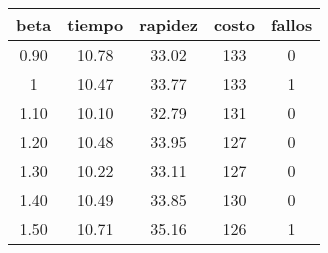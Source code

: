 \begin{table}[h!]
\centering
\begin{tabular}{ccccc}
beta & tiempo & rapidez & costo & fallos \\ 
\hline 
0.90 & 10.78 & 33.02 & 133 & 0 \\ 
1 & 10.47 & 33.77 & 133 & 1 \\ 
1.10 & 10.10 & 32.79 & 131 & 0 \\ 
1.20 & 10.48 & 33.95 & 127 & 0 \\ 
1.30 & 10.22 & 33.11 & 127 & 0 \\ 
1.40 & 10.49 & 33.85 & 130 & 0 \\ 
1.50 & 10.71 & 35.16 & 126 & 1 \\ 
\hline 
\end{tabular}
\end{table}